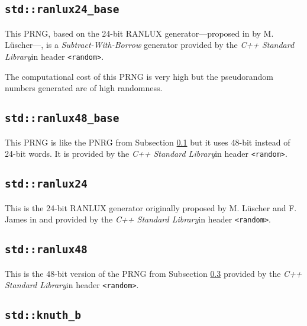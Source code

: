 \subsection[\lstinline{std::ranlux24_base}]{\lstinline{std::ranlux24_base}} \label{subsec:ranlux24_base}

    This PRNG, based on the 24-bit RANLUX generator---proposed in \cite{Luescher:1993} by M. Lüscher---, is a \emph{Subtract-With-Borrow} generator provided by the \textit{C++ Standard Library}\footnotemark[1] in header  \lstinline{<random>}\footnotemark[2].

    The computational cost of this PRNG is very high but the pseudorandom numbers generated are of high randomness.

\subsection[\lstinline{std::ranlux48_base}]{\lstinline{std::ranlux48_base}} \label{subsec:ranlux48_base}

    This PRNG is like the PNRG from Subsection \ref{subsec:ranlux24_base} but it uses 48-bit instead of 24-bit words. It is provided by the \textit{C++ Standard Library}\footnotemark[1] in header  \lstinline{<random>}\footnotemark[2].

\subsection[\lstinline{std::ranlux24}]{\lstinline{std::ranlux24}} \label{subsec:ranlux24}

    This is the 24-bit RANLUX generator originally proposed by M. Lüscher and F. James in \cite{Luescher:1993} and \cite{James:1993} provided by the \textit{C++ Standard Library}\footnotemark[1] in header  \lstinline{<random>}\footnotemark[2].

\subsection[\lstinline{std::ranlux48}]{\lstinline{std::ranlux48}} \label{subsec:ranlux48}

    This is the 48-bit version of the PRNG from Subsection \ref{subsec:ranlux24} provided by the \textit{C++ Standard Library}\footnotemark[1] in header  \lstinline{<random>}\footnotemark[2].

\subsection[\lstinline{std::knuth_b}]{\lstinline{std::knuth_b}} \label{subsec:knuth_b}

